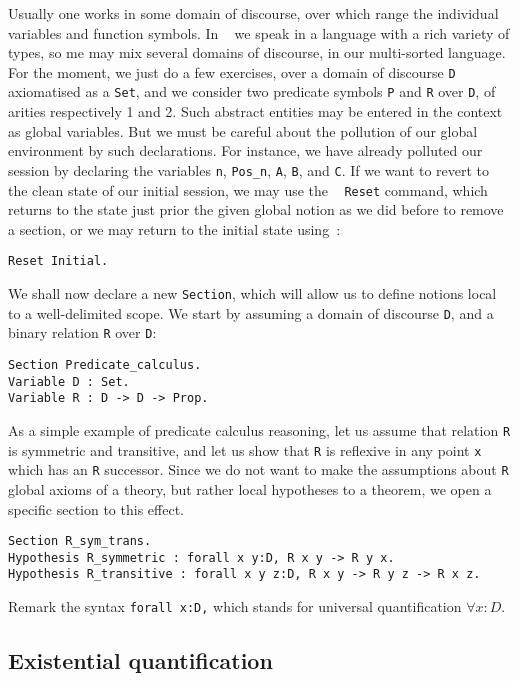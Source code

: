 \documentclass{book}
\begin{document}
Usually one works in some domain of discourse, over which range the individual 
variables and function symbols. In \Coq~ we speak in a language with a rich 
variety of types, so me may mix several domains of discourse, in our 
multi-sorted language. For the moment, we just do a few exercises, over a 
domain of discourse \verb:D: axiomatised as a \verb:Set:, and we consider two 
predicate symbols  \verb:P: and \verb:R: over \verb:D:, of arities 
respectively 1 and 2. Such abstract entities may be entered in the context
as global variables. But we must be careful about the pollution of our
global environment by such declarations. For instance, we have already 
polluted our \Coq~ session by declaring the variables
\verb:n:, \verb:Pos_n:, \verb:A:, \verb:B:, and \verb:C:. If we want to revert to the clean state of
our initial session, we may use the \Coq~ \verb:Reset: command, which returns
to the state just prior the given global notion as we did before to
remove a section, or we may return to the initial state using~:
\begin{lstlisting}
Reset Initial.
\end{lstlisting}

We shall now declare a new \verb:Section:, which will allow us to define
notions local to a well-delimited scope. We start by assuming a domain of
discourse \verb:D:, and a binary relation \verb:R:  over \verb:D:: 
\begin{lstlisting}
Section Predicate_calculus.
Variable D : Set.
Variable R : D -> D -> Prop.
\end{lstlisting}

As a simple example of predicate calculus reasoning, let us assume
that relation \verb:R: is symmetric and transitive, and let us show that
\verb:R: is reflexive in any point \verb:x: which has an \verb:R: successor.
Since we do not want to make the assumptions about \verb:R: global axioms of 
a theory, but rather local hypotheses to a theorem, we open a specific
section to this effect.
\begin{lstlisting}
Section R_sym_trans.
Hypothesis R_symmetric : forall x y:D, R x y -> R y x.
Hypothesis R_transitive : forall x y z:D, R x y -> R y z -> R x z.
\end{lstlisting}

Remark the syntax \verb+forall x:D,+ which stands for universal quantification
$\forall x : D$.

\subsection{Existential quantification}
\end{document}
